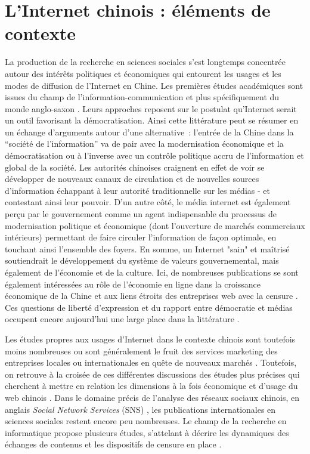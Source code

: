 \section{L’Internet chinois : éléments de contexte }
\label{sec:internet-chine}
La production de la recherche en sciences sociales s'est longtemps concentrée autour des intérêts politiques et économiques qui entourent les usages et les modes de diffusion de l’Internet en Chine. Les premières études académiques sont issues du champ de l’information-communication et plus spécifiquement du monde anglo-saxon \citep{Johnson1996,Qiu2005}. Leurs approches reposent sur le postulat qu'Internet serait un outil favorisant la démocratisation. Ainsi cette littérature peut se résumer en un échange d'arguments autour d'une alternative : l'entrée de la Chine dans la ``société de l'information'' va de pair avec la modernisation économique et la démocratisation ou à l’inverse avec un contrôle politique accru de l'information et global de la société.  Les autorités chinoises craignent en effet de voir se développer de nouveaux canaux de circulation et de nouvelles sources d'information échappant à leur autorité traditionnelle sur les médias - et contestant ainsi leur pouvoir. D'un autre côté, le média internet est également perçu par le gouvernement comme un agent indispensable du processus de modernisation politique et économique (dont l’ouverture de marchés commerciaux intérieurs) permettant de faire circuler l’information de façon optimale, en touchant ainsi l’ensemble des foyers. En somme, un Internet "sain" et maîtrisé soutiendrait le développement du système de valeurs gouvernemental, mais également de l’économie et de la culture. Ici, de nombreuses publications se sont également intéressées au rôle de l’économie en ligne dans la croissance économique de la Chine et aux liens étroits des entreprises web avec la censure \citep{Dann2008}. Ces questions de liberté d’expression et du rapport entre démocratie et médias occupent encore aujourd’hui une large place dans la littérature \citep{MacKinnon2009, Douzet2007, Yang2008}.

Les études propres aux usages d’Internet dans le contexte chinois sont toutefois moins nombreuses ou sont généralement le fruit des services marketing des entreprises locales ou internationales en quête de nouveaux marchés \citep{Hwang2005, Bergstrom2012}. Toutefois, on retrouve à la croisée de ces différentes discussions des études plus précises qui cherchent à mettre en relation les dimensions à la fois économique et d’usage du web chinois \citep{Puel2009, Fernandez2010}. Dans le domaine précis de l’analyse des réseaux sociaux chinois, en anglais \textit{Social Network Services} (SNS) , les publications internationales en sciences sociales restent encore peu nombreuses. Le champ de la recherche en informatique propose plusieurs études, s’attelant à décrire les dynamiques des échanges de contenus \citep{Yu2011} et les dispositifs de censure en place \citep{MacKinnon2012}. 

